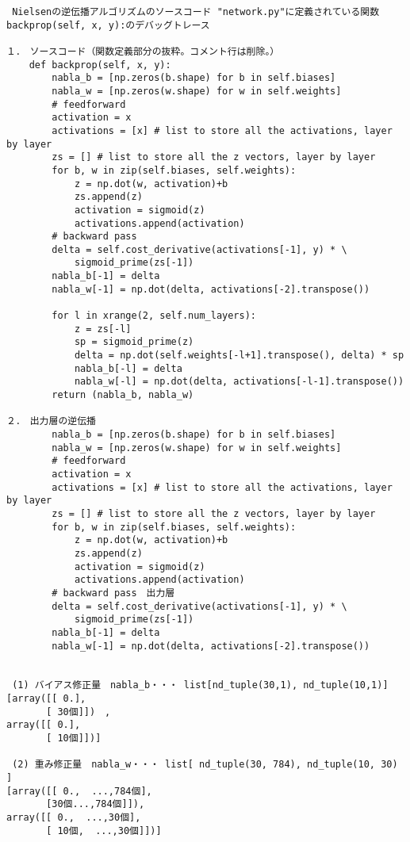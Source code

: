\documentclass[11pt,a4j,fleqn]{jarticle}
\begin{document}
\begin{verbatim}
 Nielsenの逆伝播アルゴリズムのソースコード "network.py"に定義されている関数backprop(self, x, y):のデバッグトレース

１．　ソースコード（関数定義部分の抜粋。コメント行は削除。）
    def backprop(self, x, y):
        nabla_b = [np.zeros(b.shape) for b in self.biases]
        nabla_w = [np.zeros(w.shape) for w in self.weights]
        # feedforward
        activation = x
        activations = [x] # list to store all the activations, layer by layer
        zs = [] # list to store all the z vectors, layer by layer
        for b, w in zip(self.biases, self.weights):
            z = np.dot(w, activation)+b
            zs.append(z)
            activation = sigmoid(z)
            activations.append(activation)
        # backward pass
        delta = self.cost_derivative(activations[-1], y) * \
            sigmoid_prime(zs[-1])
        nabla_b[-1] = delta
        nabla_w[-1] = np.dot(delta, activations[-2].transpose())

        for l in xrange(2, self.num_layers):
            z = zs[-l]
            sp = sigmoid_prime(z)
            delta = np.dot(self.weights[-l+1].transpose(), delta) * sp
            nabla_b[-l] = delta
            nabla_w[-l] = np.dot(delta, activations[-l-1].transpose())
        return (nabla_b, nabla_w)

２．　出力層の逆伝播
        nabla_b = [np.zeros(b.shape) for b in self.biases]
        nabla_w = [np.zeros(w.shape) for w in self.weights]
        # feedforward
        activation = x
        activations = [x] # list to store all the activations, layer by layer
        zs = [] # list to store all the z vectors, layer by layer
        for b, w in zip(self.biases, self.weights):
            z = np.dot(w, activation)+b
            zs.append(z)
            activation = sigmoid(z)
            activations.append(activation)
        # backward pass　出力層
        delta = self.cost_derivative(activations[-1], y) * \
            sigmoid_prime(zs[-1])
        nabla_b[-1] = delta
        nabla_w[-1] = np.dot(delta, activations[-2].transpose())


 (1) バイアス修正量　nabla_b・・・ list[nd_tuple(30,1), nd_tuple(10,1)]
[array([[ 0.],
       [ 30個]])　, 
array([[ 0.],
       [ 10個]])]

 (2) 重み修正量　nabla_w・・・ list[ nd_tuple(30, 784), nd_tuple(10, 30) ]
[array([[ 0.,  ...,784個],
       [30個...,784個]]), 
array([[ 0.,  ...,30個],
       [ 10個,  ...,30個]])]
       

\end{verbatim}
\end{document}
